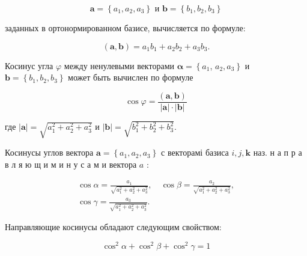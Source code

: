 \documentclass[10pt]{article}
\begin{document}
\[

\boldsymbol{a}=\left\{a_{1}, a_{2}, a_{3}\right\} \text { и } \boldsymbol{b}=\left\{b_{1}, b_{2}, b_{3}\right\}

\]



заданных в ортонормированном базисе, вычисляется по формуле:



\[

(\boldsymbol{a}, \boldsymbol{b})=a_{1} b_{1}+a_{2} b_{2}+a_{3} b_{3} .

\]



Косинус угла $\varphi$ между ненулевыми векторами $\boldsymbol{\alpha}=\left\{a_{1}\right.$, $\left.a_{2}, a_{3}\right\}$ и $\boldsymbol{b}=\left\{b_{1}, b_{2}, b_{3}\right\}$ может быть вычислен по формуле



\[

\cos \varphi=\frac{(\boldsymbol{a}, \boldsymbol{b})}{|\boldsymbol{a}| \cdot|\boldsymbol{b}|}

\]



где $|\boldsymbol{a}|=\sqrt{a_{1}^{2}+a_{2}^{2}+a_{3}^{2}}$ и $|\boldsymbol{b}|=\sqrt{b_{1}^{2}+b_{2}^{2}+b_{3}^{2}}$.



Косинусы углов вектора $\boldsymbol{a}=\left\{a_{1}, a_{2}, a_{3}\right\}$ с векторамі базиса $i, j, \boldsymbol{k}$ наз. н а п р а в л я ю щ и м и н у с а м и вектора $a$ :



\[

\begin{gathered}

\cos \alpha=\frac{a_{1}}{\sqrt{a_{1}^{2}+a_{2}^{2}+a_{3}^{2}}}, \quad \cos \beta=\frac{a_{2}}{\sqrt{a_{1}^{2}+a_{2}^{2}+a_{3}^{2}}}, \\

\cos \gamma=\frac{a_{3}}{\sqrt{a_{1}^{2}+a_{2}^{2}+a_{3}^{2}}} .

\end{gathered}

\]



Направляющие косинусы обладают следующим свойством:



\[

\cos ^{2} \alpha+\cos ^{2} \beta+\cos ^{2} \gamma=1

\]
\end{document}
